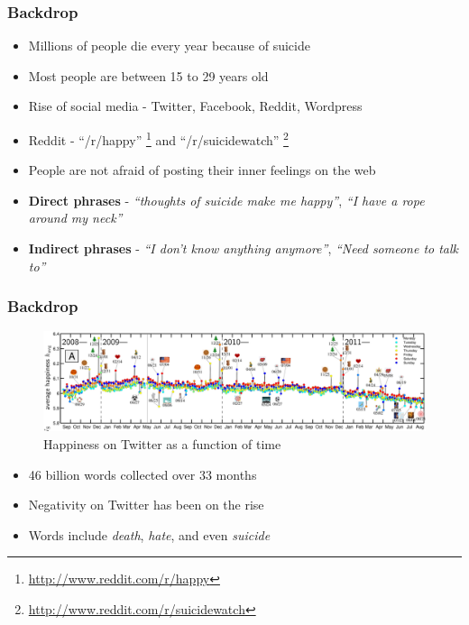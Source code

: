 \documentclass{beamer}
\begin{document}
    \begin{frame}
        \frametitle{Backdrop}
        \begin{itemize}
            \item{Millions of people die every year because of suicide}
            \item{Most people are between 15 to 29 years old}
            \item{Rise of social media - Twitter, Facebook, Reddit, Wordpress}
            \item{Reddit - ``/r/happy'' \footnote{\url{http://www.reddit.com/r/happy}} and ``/r/suicidewatch'' \footnote{\url{http://www.reddit.com/r/suicidewatch}}}
            \item{People are not afraid of posting their inner feelings on the web}
            \item{\textbf{Direct phrases} - \emph{``thoughts of suicide make me happy''}, \emph{``I have a rope around my neck''}}
            \item{\textbf{Indirect phrases} - \emph{``I don't know anything anymore''}, \emph{``Need someone to talk to''}}
        \end{itemize}
    \end{frame}
    
    \begin{frame}
        \frametitle{Backdrop}
        \begin{figure}
            \centering
            \includegraphics[width=\textwidth]{figures/twitter_happiness.png}
            \caption{Happiness on Twitter as a function of time}
        \end{figure}
        \begin{itemize}
            \item{46 billion words collected over 33 months}
            \item{Negativity on Twitter has been on the rise}
            \item{Words include \emph{death}, \emph{hate}, and even \emph{suicide}}
        \end{itemize}
    \end{frame}
    
\end{document}
